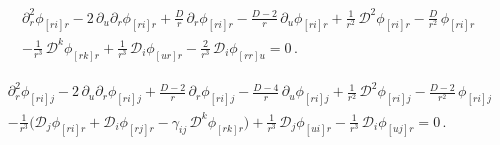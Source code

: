 \documentclass[a4paper,12pt]{article}
\begin{document}
\begin{equation}
\begin{aligned}
&\partial_r^2 \phi_{[ri]r}
-2\,\partial_u\partial_r \phi_{[ri]r}
+\frac{D}{r}\,\partial_r \phi_{[ri]r}
-\frac{D-2}{r}\,\partial_u \phi_{[ri]r}
+\frac{1}{r^2}\,\mathcal{D}^2 \phi_{[ri]r}
-\frac{D}{r^2}\,\phi_{[ri]r}
\\
&
-\frac{1}{r^3}\,\mathcal{D}^k \phi_{[rk]r}
+\frac{1}{r^3}\,\mathcal{D}_i \phi_{[ur]r}
-\frac{2}{r^3}\,\mathcal{D}_i \phi_{[rr]u}=0 \, .
\end{aligned}
\end{equation}


\begin{equation}
\begin{aligned}
&\partial_r^2 \phi_{[ri]j}
-2\,\partial_u\partial_r \phi_{[ri]j}
+\frac{D-2}{r}\,\partial_r \phi_{[ri]j}
-\frac{D-4}{r}\,\partial_u \phi_{[ri]j}
+\frac{1}{r^2}\,\mathcal{D}^2 \phi_{[ri]j}
-\frac{D-2}{r^2}\,\phi_{[ri]j}
\\
&
-\frac{1}{r^3}\Big(
\mathcal{D}_j \phi_{[ri]r}
+\mathcal{D}_i \phi_{[rj]r}
-\gamma_{ij}\,\mathcal{D}^k \phi_{[rk]r}
\Big)
+\frac{1}{r^3}\,\mathcal{D}_j \phi_{[ui]r}
-\frac{1}{r^3}\,\mathcal{D}_i \phi_{[uj]r}=0 \, .
\end{aligned}
\end{equation}

\end{document}
